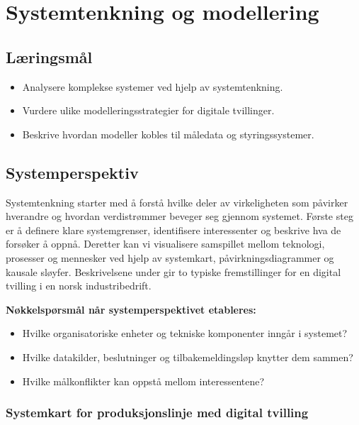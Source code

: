\chapter{Systemtenkning og modellering}


\section{Læringsmål}
\begin{itemize}
    \item Analysere komplekse systemer ved hjelp av systemtenkning.
    \item Vurdere ulike modelleringsstrategier for digitale tvillinger.
    \item Beskrive hvordan modeller kobles til måledata og styringssystemer.
\end{itemize}

\section{Systemperspektiv}
Systemtenkning starter med å forstå hvilke deler av virkeligheten som påvirker hverandre og hvordan verdistrømmer beveger seg gjennom systemet. Første steg er å definere klare systemgrenser, identifisere interessenter og beskrive hva de forsøker å oppnå. Deretter kan vi visualisere samspillet mellom teknologi, prosesser og mennesker ved hjelp av systemkart, påvirkningsdiagrammer og kausale sløyfer. Beskrivelsene under gir to typiske fremstillinger for en digital tvilling i en norsk industribedrift.

\textbf{Nøkkelspørsmål når systemperspektivet etableres:}
\begin{itemize}
    \item Hvilke organisatoriske enheter og tekniske komponenter inngår i systemet?
    \item Hvilke datakilder, beslutninger og tilbakemeldingsløp knytter dem sammen?
    \item Hvilke målkonflikter kan oppstå mellom interessentene?
\end{itemize}

\subsection{Systemkart for produksjonslinje med digital tvilling}
